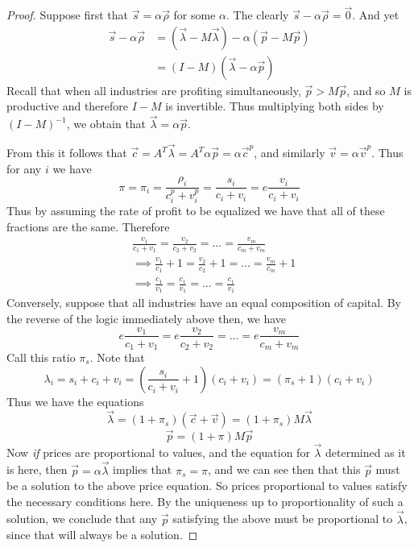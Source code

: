 \begin{proof}
	Suppose first that $\vec{s} = \alpha\vec{\rho}$ for some $\alpha$. The clearly $\vec{s} - \alpha\vec{\rho} = \vec{0}$. And yet
	\begin{align*}
		\vec{s} - \alpha\vec{\rho} &= (\vec{\lambda} - M\vec{\lambda}) - \alpha(\vec{p} - M\vec{p}) \\
		&= (I-M)(\vec{\lambda} - \alpha\vec{p})
	\end{align*}
Recall that when all industries are profiting simultaneously, $\vec{p} > M\vec{p}$, and so $M$ is productive and therefore $I-M$ is invertible. Thus multiplying both sides by $(I-M)^{-1}$, we obtain that $\vec{\lambda} = \alpha\vec{p}$. \par 
From this it follows that $\vec{c} = A^T\vec{\lambda} = A^T\alpha\vec{p} = \alpha\vec{c}^p$, and similarly $\vec{v} = \alpha\vec{v}^p$. Thus for any $i$ we have
\[ \pi = \pi_i = \frac{\rho_i}{c_i^p + v_i^p} = \frac{s_i}{c_i+v_i} = e\frac{v_i}{c_i+v_i} \]
Thus by assuming the rate of profit to be equalized we have that all of these fractions are the same. Therefore 
\begin{align*}
	& \frac{v_1}{c_1+v_1} = \frac{v_2}{c_2+v_2} = \ldots = \frac{v_m}{c_m+v_m} \\
	&\implies \frac{v_1}{c_1}+1 = \frac{v_2}{c_2}+1 = \ldots = \frac{v_m}{c_m}+1 \\
	&\implies \frac{c_1}{v_1} = \frac{c_1}{v_1} = \ldots = \frac{c_1}{v_1}
\end{align*}
Conversely, suppose that all industries have an equal composition of capital. By the reverse of the logic immediately above then, we have
\[ e\frac{v_1}{c_1+v_1} = e\frac{v_2}{c_2+v_2} = \ldots = e\frac{v_m}{c_m+v_m} \]
Call this ratio $\pi_s$. Note that
\[ \lambda_i = s_i + c_i + v_i = (\frac{s_i}{c_i+v_i} + 1)(c_i+v_i) = (\pi_s+1)(c_i+v_i) \]
Thus we have the equations
\[ \vec{\lambda} = (1+\pi_s)(\vec{c} + \vec{v}) = (1+\pi_s)M\vec{\lambda} \]
\[ \vec{p} = (1+\pi)M\vec{p} \]
Now \textit{if} prices are proportional to values, and the equation for $\vec{\lambda}$ determined as it is here, then $\vec{p} = \alpha\vec{\lambda}$ implies that $\pi_s = \pi$, and we can see then that this $\vec{p}$ must be a solution to the above price equation. So prices proportional to values satisfy the necessary conditions here. By the uniqueness up to proportionality of such a solution, we conclude that any $\vec{p}$ satisfying the above must be proportional to $\vec{\lambda}$, since that will always be a solution. 
\end{proof}
